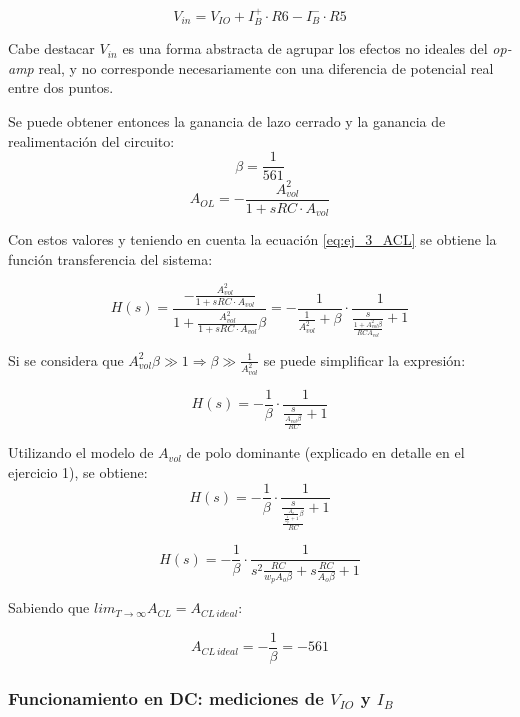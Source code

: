 \documentclass[../../main.tex]{subfiles}
\begin{document}
\begin{equation}
	V_{in} = V_{IO} + I_B^+\cdot R6 - I_B^-\cdot R5
	\label{eq:ej_3_vin_aparente}
\end{equation}

Cabe destacar $V_{in}$ es una forma abstracta de agrupar los efectos no ideales del \textit{op-amp} real, y no corresponde necesariamente con una diferencia de potencial real entre dos puntos.

 Se puede obtener entonces la ganancia de lazo cerrado y la ganancia de realimentaci\'on del circuito:
\[\beta = \frac{1}{561}\]
\[A_{OL} = -\frac{A_{vol}^2}{1+sRC\cdot A_{vol}}\]

Con estos valores y teniendo en cuenta la ecuaci\'on \ref{eq:ej_3_ACL} se obtiene la funci\'on transferencia del sistema:

\begin{equation}
	H(s)=\frac{-\frac{A_{vol}^2}{1+sRC\cdot A_{vol}}}{1+\frac{A_{vol}^2}{1+sRC\cdot A_{vol}}\beta}
	=-\frac{1}{\frac{1}{A_{vol}^2}+\beta}\cdot \frac{1}{\frac{s}{\frac{1+A_{vol}^2\beta}{RCA_{vol}}} +1}
	\label{eg:ej_3_transferencia_consigna_sin_simplificar}
\end{equation}


Si se considera que $A_{vol}^2\beta \gg 1 \Rightarrow \beta \gg \frac{1}{A_{vol}^2}$ se puede simplificar la expresi\'on:



	\[H(s) = -\frac{1}{\beta}\cdot \frac{1}{\frac{s}{\frac{A_{vol}\beta}{RC}}+1}\]


Utilizando el modelo de $A_{vol}$ de polo dominante (explicado en detalle en el ejercicio 1), se obtiene:
\[H(s) = -\frac{1}{\beta} \cdot \frac{1}{\frac{s}{\frac{\frac{A_o}{\frac{1}{\omega _p}+1}\beta}{RC}}+1} \]

\begin{equation}
	H(s) = -\frac{1}{\beta} \cdot \frac{1}{s^2\frac{RC}{w_pA_o\beta}+s\frac{RC}{A_o\beta}+1}
	\label{eq:ej_3_transferencia_consigna_simplificada}
\end{equation}



Sabiendo que $lim_{T\rightarrow \infty}A_{CL} = A_{CL\,ideal}$:

\begin{equation}
	A_{CL\,ideal} = -\frac{1}{\beta} = -561
\end{equation}


\subsubsection{Funcionamiento en DC: mediciones de $V_{IO}$ y $I_B$}
\end{document}
